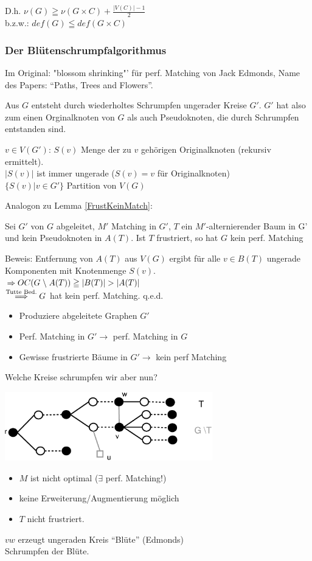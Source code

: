 D.h. $\nu(G) \geqq \nu(G \times C) + \frac{|V(C)|-1}{2}$\\
b.z.w.: $def(G) \leqq def(G\times C)$

\subsubsection{Der Blütenschrumpfalgorithmus}

Im Original: "blossom shrinking"' für perf. Matching von Jack Edmonds, Name
des Papers: "`Paths, Trees and Flowers"'.

Aus $G$ entsteht durch wiederholtes Schrumpfen ungerader Kreise $G'$. $G'$
hat also zum einen Orginalknoten von $G$ als auch Pseudoknoten, die durch
Schrumpfen entstanden sind.

$v \in V(G')$: $S(v)$ Menge der zu $v$ gehörigen Originalknoten (rekursiv
ermittelt).\\
$|S(v)|$ ist immer ungerade ($S(v) = {v}$ für Originalknoten)\\
$\{ S(v) | v \in G' \}$ Partition von $V(G)$

Analogon zu Lemma \ref{FrustKeinMatch}:
\begin{lemma} \label{BSFrustKeinMatch}
Sei $G'$ von $G$ abgeleitet, $M'$ Matching in $G'$, $T$ ein
$M'$-alternierender Baum in G' und kein Pseudoknoten in $A(T)$. Ist $T$
frustriert, so hat $G$ kein perf. Matching
\end{lemma}
Beweis: Entfernung von $A(T)$ aus $V(G)$ ergibt für alle $v\in B(T)$
ungerade Komponenten mit Knotenmenge $S(v)$.\\
$\Rightarrow OC(G\wout A(T))\geqq |B(T)|> |A(T)|$\\
$\stackrel{\mbox{\scriptsize Tutte Bed.}}{\Longrightarrow} G$ hat kein perf. 
Matching. q.e.d.

\begin{itemize}
\item Produziere abgeleitete Graphen $G'$
\item Perf. Matching in $G'\rightarrow$ perf. Matching in $G$
\item Gewisse frustrierte Bäume in $G' \rightarrow$ kein perf Matching 
\end{itemize}

Welche Kreise schrumpfen wir aber nun?

\includegraphics[height=3cm]{bilder/5-2Bluetenschr1}
\begin{itemize}
\item $M$ ist nicht optimal ($\exists$ perf. Matching!)
\item keine Erweiterung/Augmentierung möglich
\item $T$ nicht frustriert.
\end{itemize}
$vw$ erzeugt ungeraden Kreis "`Blüte"' (Edmonds)\\
Schrumpfen der Blüte.

